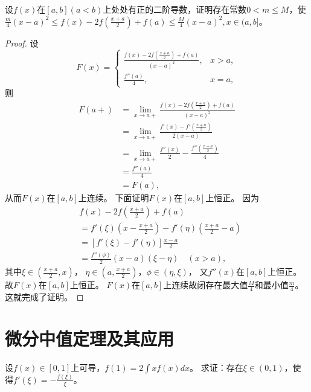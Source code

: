   \begin{exercise}
 设$f(x)$在$[a,b](a<b)$上处处有正的二阶导数，证明存在常数$0<m\leq M$，使$\frac m4(x-a)^2\leq f(x)-2f(\frac{x+a}2)+f(a)\leq \frac M4(x-a)^2,x\in(a,b]$。
  \end{exercise}
  
  \begin{proof}
  设
  \begin{equation*}
    F(x)=
    \begin{cases}
    \frac{f(x)-2f(\frac{x+a}{2})+f(a)}{(x-a)^2},&x>a,\\
    \frac{f''(a)}{4},&x=a,
    \end{cases}
  \end{equation*}
  则
  \begin{align*}
  F(a+)&=\lim_{x\rightarrow a+}\frac{f(x)-2f(\frac{x+a}{2})+f(a)}{(x-a)^2}\\
  &=\lim_{x\rightarrow a+}\frac{f'(x)-f'(\frac{x+a}{2})}{2(x-a)}\\
  &=\lim_{x\rightarrow a+}\frac{f''(x)}{2}-\frac{f''(\frac{x+a}{2})}{4}\\
  &=\frac{f''(a)}{4}\\
  &=F(a),
  \end{align*}
  从而$F(x)$在$[a,b]$上连续。
  下面证明$F(x)$在$[a,b]$上恒正。
 因为
 \begin{align*}
 &f(x)-2f(\frac{x+a}{2})+f(a)\\
 &=f'(\xi)(x-\frac{x+a}{2})-f'(\eta)(\frac{x+a}{2}-a)\\
 &=[f'(\xi)-f'(\eta)]\frac{x-a}{2}\\
 &=\frac{f''(\phi)}2(x-a)(\xi-\eta)\quad(x>a),
 \end{align*}
 其中$\xi\in(\frac{x+a}{2},x)$，
 $\eta\in(a,\frac{x+a}{2})$，$\phi\in(\eta,\xi)$，
 又$f''(x)$在$[a,b]$上恒正。
 故$F(x)$在$[a,b]$上恒正。
 $F(x)$在$[a,b]$上连续故闭存在最大值$\frac{M}{4}$和最小值$\frac{m}{4}$。
 这就完成了证明。  
  \end{proof}  

  \section{微分中值定理及其应用}

  \begin{example}
    设$f(x)\in[0,1]$上可导，$f(1)=2\int xf(x)dx$。
    求证：存在$\xi\in(0,1)$，使得$f'(\xi)=-\frac{f(\xi)}{\xi}$。
  \end{example}
  
